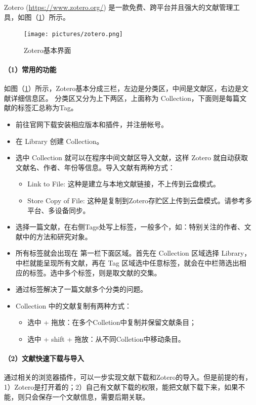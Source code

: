 Zotero (\url{https://www.zotero.org/}) 是一款免费、跨平台并且强大的文献管理工具，如图（\ref{fig566}）所示。
\begin{figure}[h!]
\centering
\texttt{[image: pictures/zotero.png]}
\caption{Zotero基本界面}
\label{fig566}
\end{figure}




\paragraph{（1）常用的功能}
如图（\ref{fig566}）所示，Zotero基本分成三栏，左边是分类区，中间是文献区，右边是文献详细信息区。
分类区又分为上下两区，上面称为 Collection，下面则是每篇文献的标签汇总称为Tag。
\begin{itemize}
\item 前往官网下载安装相应版本和插件，并注册帐号。
\item 在 Library 创建 Collection。
\item 选中 Collection 就可以在程序中间文献区导入文献，这样 Zotero 就自动获取文献名、作者、年份等信息。导入文献有两种方式：
\begin{itemize}
\item Link to File: 这种是建立与本地文献链接，不上传到云盘模式。
\item Store Copy of File: 这种是复制到Zotero存贮区上传到云盘模式。请参考多平台、多设备同步。
\end{itemize}
\item 选择一篇文献，在右侧Tags处写上标签，一般多个，如：特别关注的作者、文献中的方法和研究对象。
\item 所有标签就会出现在 第一栏下面区域。首先在 Collection 区域选择 Library，中栏就能呈现所有文献，再在 Tag 区域选中任意标签，就会在中栏筛选出相应的标签。选中多个标签，则是取文献的交集。
\item 通过标签解决了一篇文献多个分类的问题。
\item Collection 中的文献复制有两种方式：
\begin{itemize}
\item 选中 + 拖放：在多个Colletion中复制并保留文献条目； 
\item 选中 + shift + 拖放：从不同Colletion中移动条目。
\end{itemize}
\end{itemize}



\paragraph{（2）文献快速下载与导入}
通过相关的浏览器插件，可以一步实现文献下载和Zotero的导入。但是前提的有，1）Zotero是打开着的；2）自己有文献下载的权限，能把文献下载下来，如果不能，则只会保存一个文献信息，需要后期关联。



